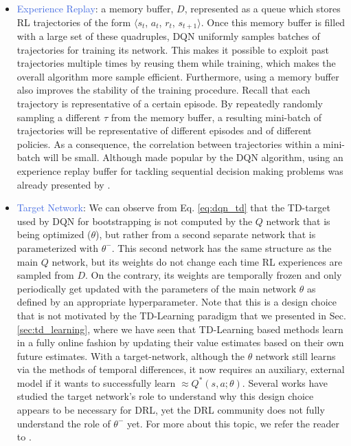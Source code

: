 \begin{itemize}
	\item \textcolor{RoyalBlue}{Experience Replay}: a memory buffer, $D$, represented as a queue which stores RL trajectories of the form $\langle s_{t}$, $a_{t}$, $r_{t}$, $s_{t+1} \rangle$. Once this memory buffer is filled with a large set of these quadruples, DQN uniformly samples batches of trajectories for training its network. This makes it possible to exploit past trajectories multiple times by reusing them while training, which makes the overall algorithm more sample efficient. Furthermore, using a memory buffer also improves the stability of the training procedure. Recall that each trajectory is representative of a certain episode. By repeatedly randomly sampling a different $\tau$ from the memory buffer, a resulting mini-batch of trajectories will be representative of different episodes and of different policies. As a consequence, the correlation between trajectories within a mini-batch will be small. Although made popular by the DQN algorithm, using an experience replay buffer for tackling sequential decision making problems was already presented by \citet{lin1992self}.
		
	\item \textcolor{RoyalBlue}{Target Network}: We can observe from Eq. \ref{eq:dqn_td} that the TD-target used by DQN for bootstrapping is not computed by the $Q$ network that is being optimized ($\theta$), but rather from a second separate network that is parameterized with $\theta^{-}$. This second network has the same structure as the main $Q$ network, but its weights do not change each time RL experiences are sampled from $D$. On the contrary, its weights are temporally frozen and only periodically get updated with the parameters of the main network $\theta$ as defined by an appropriate hyperparameter. Note that this is a design choice that is not motivated by the TD-Learning paradigm that we presented in Sec. \ref{sec:td_learning}, where we have seen that TD-Learning based methods learn in a fully online fashion by updating their value estimates based on their own future estimates. With a target-network, although the $\theta$ network still learns via the methods of temporal differences, it now requires an auxiliary, external model if it wants to successfully learn $\approx Q^{*}(s,a;\theta)$. Several works have studied the target network's role to understand why this design choice appears to be necessary for DRL, yet the DRL community does not fully understand the role of $\theta^{-}$ yet. For more about this topic, we refer the reader to \cite{kim2019deepmellow, piche2021beyond}.

\end{itemize}

